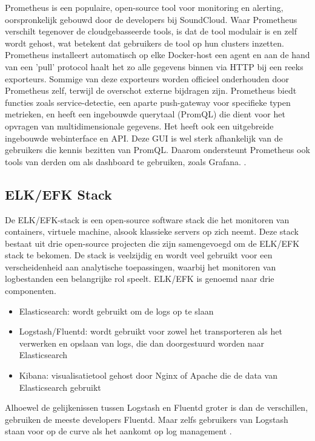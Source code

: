 Prometheus is een populaire, open-source tool voor monitoring en alerting, oorspronkelijk gebouwd door de developers bij SoundCloud. Waar Prometheus verschilt tegenover de cloudgebasseerde tools, is dat de tool modulair is en zelf wordt gehost, wat betekent dat gebruikers de tool op hun clusters inzetten. Prometheus installeert automatisch op elke Docker-host een agent en aan de hand van een 'pull' protocol haalt het zo alle gegevens binnen via HTTP bij een reeks exporteurs. Sommige van deze exporteurs worden officieel onderhouden door Prometheus zelf, terwijl de overschot externe bijdragen zijn. Prometheus biedt functies zoals service-detectie, een aparte push-gateway voor specifieke typen metrieken, en heeft een ingebouwde querytaal (PromQL) die dient voor het opvragen van multidimensionale gegevens. Het heeft ook een uitgebreide ingebouwde webinterface en API. Deze GUI is wel sterk afhankelijk van de gebruikers die kennis bezitten van PromQL. Daarom ondersteunt Prometheus ook tools van derden om als dashboard te gebruiken, zoals Grafana. \autocite{Sissons2021}.  

\subsection{ELK/EFK Stack}

De ELK/EFK-stack is een open-source software stack die het monitoren van containers, virtuele machine, alsook klassieke servers op zich neemt. Deze stack bestaat uit drie open-source projecten die zijn samengevoegd om de ELK/EFK stack te bekomen. De stack is veelzijdig en wordt veel gebruikt voor een verscheidenheid aan analytische toepassingen, waarbij het monitoren van logbestanden een belangrijke rol speelt. ELK/EFK is genoemd naar drie componenten.

\begin{itemize}
    \item Elasticsearch: wordt gebruikt om de logs op te slaan
    \item Logstash/Fluentd: wordt gebruikt voor zowel het transporteren als het verwerken en opslaan van logs, die dan doorgestuurd worden naar Elasticsearch
    \item Kibana: visualisatietool gehost door Nginx of Apache die de data van Elasticsearch gebruikt
\end{itemize}

Alhoewel de gelijkenissen tussen Logstash en Fluentd groter is dan de verschillen, gebruiken de meeste developers Fluentd. Maar zelfs gebruikers van Logstash staan voor op de curve als het aankomt op log management \autocite{Sissons2021}.

